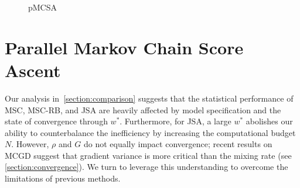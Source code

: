 
%
\begin{wrapfigure}[12]{r}{0.43\textwidth}
\vspace{-7ex}
\begin{minipage}[c]{0.43\textwidth}
  \begin{algorithm2e}[H]
    \DontPrintSemicolon
    \SetAlgoLined
    \caption{pMCSA}\label{alg:pmcsa}
  \end{algorithm2e}
\end{minipage}
\end{wrapfigure}
%
\vspace{-1.ex}
\section{Parallel Markov Chain Score Ascent}\label{section:pmcsa}
\vspace{-1.5ex}
Our analysis in~\cref{section:comparison} suggests that the statistical performance of MSC, MSC-RB, and JSA are heavily affected by model specification and the state of convergence through \(w^*\).
Furthermore, for JSA, a large \(w^*\) abolishes our ability to counterbalance the inefficiency by increasing the computational budget \(N\).
However, \(\rho\) and \(G\) do not equally impact convergence; recent results on MCGD suggest that gradient variance is more critical than the mixing rate (see \cref{section:convergence}).
We turn to leverage this understanding to overcome the limitations of previous methods.

\vspace{-1.ex}
